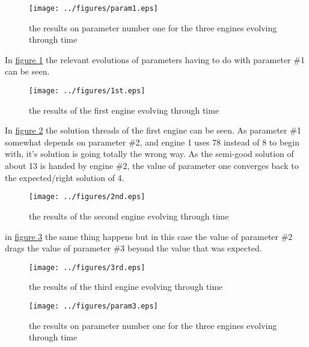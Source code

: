\documentclass[]{lofar}
\begin{document}
      \begin{figure}
        \texttt{[image: ../figures/param1.eps]}
        \hypertarget{fig:param1}{}
        \caption{the results on parameter number one for the three engines evolving through time\label{fig:param1}}
      \end{figure}

      In \hyperlink{fig:param1}{figure \ref{fig:param1}} the relevant
      evolutions of parameters having to do with parameter \#1 can be
      seen.

      \begin{figure}
        \texttt{[image: ../figures/1st.eps]}
        \hypertarget{fig:1st}{}
        \caption{the results of the first engine evolving through time\label{fig:1st}}
      \end{figure}

      In \hyperlink{fig:1st}{figure \ref{fig:1st}} the solution threads of the
      first engine can be seen. As parameter \#1 somewhat depends on
      parameter \#2, and engine 1 uses 78 instead of 8 to begin with,
      it's solution is going totally the wrong way. As the semi-good
      solution of about 13 is handed by engine \#2, the value of
      parameter one converges back to the expected/right solution of 4.

      \begin{figure}
        \texttt{[image: ../figures/2nd.eps]}
        \hypertarget{fig:2nd}{}
        \caption{the results of the second engine evolving through time\label{fig:2nd}}
      \end{figure}

      in \hyperlink{2nd}{figure \ref{fig:2nd}} the same thing happens but
      in this case the value of parameter \#2 drags the value of
      parameter \#3 beyond the value that was expected.

      \begin{figure}
        \texttt{[image: ../figures/3rd.eps]}
        \hypertarget{fig:3rd}{}%
        \caption{the results of the third engine evolving through time\label{fig:3rd}}
      \end{figure}

      \begin{figure}
        \texttt{[image: ../figures/param3.eps]}
        \hypertarget{fig:param3}{}%
        \caption{the results on parameter number one for the three engines evolving through time\label{fig:param3}}
      \end{figure}
\end{document}
